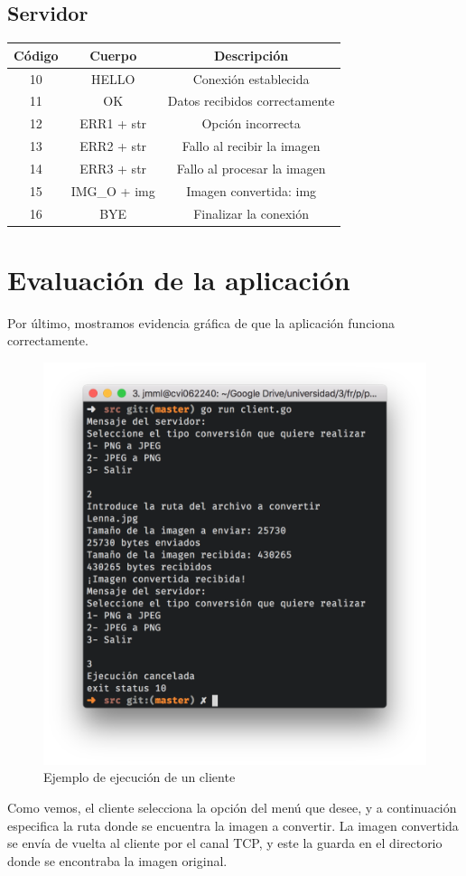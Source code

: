 \documentclass[11pt]{article}
\begin{document}
\subsection{Servidor}
\begin{center}
	\begin{tabular}{|c|c|c|}
	\hline
	Código & Cuerpo & Descripción\\
	\hline
	10 & HELLO & Conexión establecida\\
	\hline
	11 & OK & Datos recibidos correctamente\\
	\hline
	12 & ERR1 + str & Opción incorrecta\\
	\hline
	13 & ERR2 + str & Fallo al recibir la imagen\\
	\hline
	14 & ERR3 + str & Fallo al procesar la imagen\\
	\hline
	15 & IMG\_O + img & Imagen convertida: img\\
	\hline
	16 & BYE & Finalizar la conexión\\
	\hline 
\end{tabular}	
\end{center}

\section{Evaluación de la aplicación}

Por último, mostramos evidencia gráfica de que la aplicación funciona correctamente.

\begin{figure}[h]
	\centering
	\includegraphics[width=.5\textwidth]{img/cliente}
	\caption{Ejemplo de ejecución de un cliente}
\end{figure}

Como vemos, el cliente selecciona la opción del menú que desee, y a continuación especifica la ruta donde se encuentra la imagen a convertir. La imagen convertida se envía de vuelta al cliente por el canal TCP, y este la guarda en el directorio donde se encontraba la imagen original.
\end{document}
